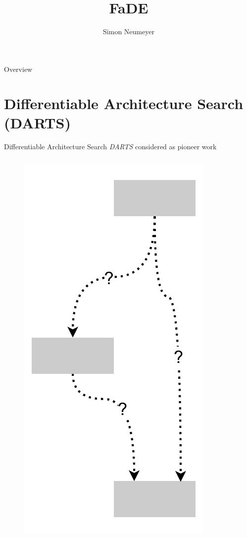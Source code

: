 \documentclass[]{beamer}
\title{FaDE}
\author{Simon Neumeyer}
\date{}
\begin{document}
  {
  }

\begin{frame}{Overview}
\tableofcontents
\end{frame}

\section{Differentiable Architecture Search (DARTS)}
\begin{frame}{Differentiable Architecture Search}
\vspace{10pt}
\textit{DARTS} \cite{Liu2018} considered as pioneer work
\vfill
\begin{columns}
\begin{column}{.35\textwidth}
\begin{figure}
	\includegraphics[scale=0.4, center]{graphics/quick/darts_0.drawio.pdf}
\end{figure}
\end{column}
\begin{column}{.3\textwidth}
\end{column}
\begin{column}{.35\textwidth}
\end{column}
\end{columns}
\end{frame}
\end{document}
